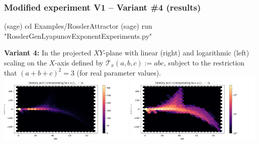 \documentclass[usenames,svgnames,dvipsnames,10pt]{beamer}
\begin{document}
\begin{frame}[fragile]
\frametitle{Modified experiment V1 -- Variant \#4 (results)}

\begin{center}
\begin{code}
(sage) cd Examples/RosslerAttractor
(sage) run "RosslerGenLyapunovExponentExperiments.py"
\end{code}
\textbf{Variant 4:} 
In the projected $XY$-plane with linear (right) and logarithmic (left) scaling on the $X$-axis defined by 
$\mathcal{T}_x(a, b, c) := abc$, subject to the restriction that 
$(a+b+c)^2 = 3$ (for real parameter values). \\ 
\includegraphics[width=0.49\textwidth]{../Images/RosslerAttractorExpt1-Variant4-linearscale-TypeXY-2021-10-27-040705.png}
\includegraphics[width=0.49\textwidth]{../Images/RosslerAttractorExpt1-Variant4-logscale-TypeXY-2021-10-27-035400.png}
\end{center}

\end{frame}
\end{document}
